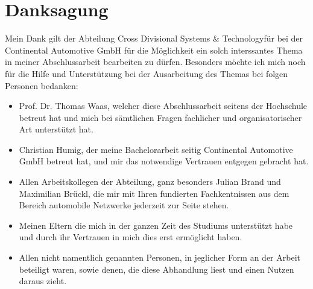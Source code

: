 \def\danksag{Danksagung}

\chapter*{\danksag}
Mein Dank gilt der Abteilung Cross Divisional Systems \& Technologyfür bei der Continental Automotive GmbH für die Möglichkeit ein solch interssantes Thema in meiner Abschlussarbeit bearbeiten zu dürfen.
Besonders möchte ich mich noch für die Hilfe und Unterstützung bei der Ausarbeitung des Themas bei folgen Personen bedanken:
\begin{itemize}
	\item Prof. Dr. Thomas Waas, welcher diese Abschlussarbeit seitens der Hochschule betreut hat und mich bei sämtlichen Fragen fachlicher und organisatorischer Art	unterstützt hat.
	\item Christian Humig, der meine Bachelorarbeit seitig Continental Automotive
	GmbH betreut hat, und mir das notwendige Vertrauen entgegen gebracht hat. 
	\item Allen Arbeitskollegen der Abteilung, ganz besonders Julian Brand und Maximilian Brückl, die mir mit Ihren fundierten Fachkentnissen aus dem Bereich automobile Netzwerke jederzeit zur Seite stehen.
	\item Meinen Eltern die mich in der ganzen Zeit des Studiums unterstützt habe und durch ihr Vertrauen in mich dies erst ermöglicht haben.
	\item Allen nicht namentlich genannten Personen, in jeglicher Form an der Arbeit beteiligt waren, sowie denen, die diese Abhandlung liest und einen Nutzen daraus zieht.
\end{itemize}